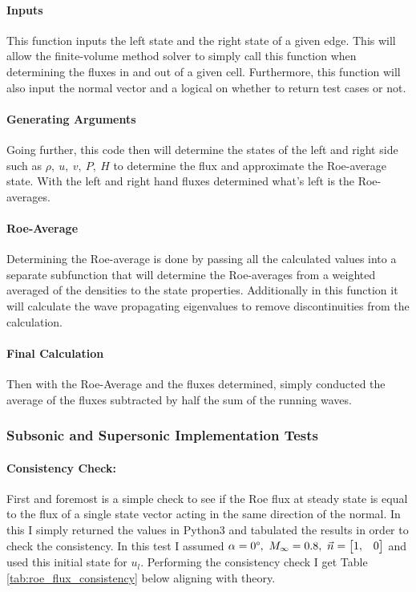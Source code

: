 \paragraph{Inputs} This function inputs the left state and the right state of a given edge. This will allow the finite-volume method solver to simply call this function when determining the fluxes in and out of a given cell. Furthermore, this function will also input the normal vector and a logical on whether to return test cases or not.

\paragraph{Generating Arguments} Going further, this code then will determine the states of the left and right side such as $\rho,\ u,\ v,\ P,\ H$ to determine the flux and approximate the Roe-average state. With the left and right hand fluxes determined what's left is the Roe-averages.

\paragraph{Roe-Average} Determining the Roe-average is done by passing all the calculated values into a separate subfunction that will determine the Roe-averages from a weighted averaged of the densities to the state properties. Additionally in this function it will calculate the wave propagating eigenvalues to remove discontinuities from the calculation.

\paragraph{Final Calculation} Then with the Roe-Average and the fluxes determined, simply conducted the average of the fluxes subtracted by half the sum of the running waves.\cite{notes:gryphon}

\pagebreak
\subsubsection{Subsonic and Supersonic Implementation Tests}

\paragraph{Consistency Check:} First and foremost is a simple check to see if the Roe flux at steady state is equal to the flux of a single state vector acting in the same direction of the normal. In this I simply returned the values in Python3 and tabulated the results in order to check the consistency. In this test I assumed $\alpha = 0\degree,\ M_\infty = 0.8,\ \vec{n} = \begin{bmatrix} 1, & 0 \end{bmatrix}$ and used this initial state for $u_l$. Performing the consistency check I get Table \ref{tab:roe_flux_consistency} below aligning with theory.


